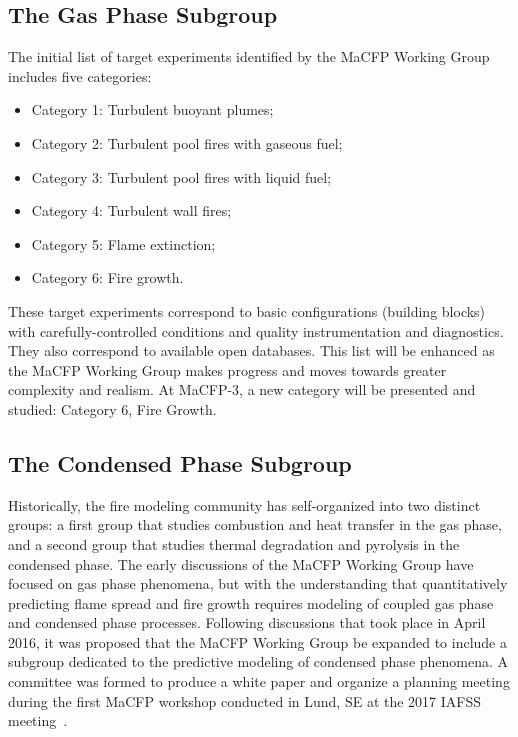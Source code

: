 \documentclass[12pt]{article}
\begin{document}
\subsection{The Gas Phase Subgroup}
The initial list of target experiments identified by the MaCFP Working Group includes five categories:
\begin{itemize}[noitemsep]
 \item Category 1: Turbulent buoyant plumes;
 \item Category 2: Turbulent pool fires with gaseous fuel;
 \item Category 3: Turbulent pool fires with liquid fuel;
 \item Category 4: Turbulent wall fires;
 \item Category 5: Flame extinction;
 \item Category 6: Fire growth.
\end{itemize}
These target experiments correspond to basic configurations (building blocks) with carefully-controlled conditions and quality instrumentation and diagnostics. They also correspond to available open databases. This list will be enhanced as the MaCFP Working Group makes progress and moves towards greater complexity and realism. At MaCFP-3, a new category will be presented and studied: Category 6, Fire Growth.

\subsection{The Condensed Phase Subgroup}
Historically, the fire modeling community has self-organized into two distinct groups: a first group that studies combustion and heat transfer in the gas phase, and a second group that studies thermal degradation and pyrolysis in the condensed phase. The early discussions of the MaCFP Working Group have focused on gas phase phenomena, but with the understanding that quantitatively predicting flame spread and fire growth requires modeling of coupled gas phase and condensed phase processes. Following discussions that took place in April 2016, it was proposed that the MaCFP Working Group be expanded to include a subgroup dedicated to the predictive modeling of condensed phase phenomena. A committee was formed to produce a white paper and organize a planning meeting during the first MaCFP workshop conducted in Lund, SE at the 2017 IAFSS meeting~\cite{brown2018proceedings}. 
\end{document}

